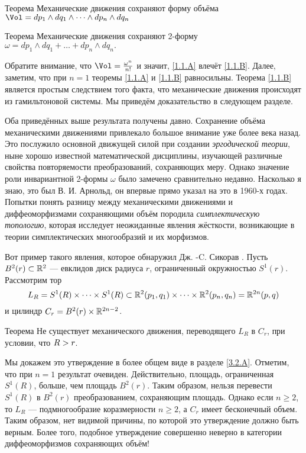 \begin{thm}{Теорема}\label{1.1.A}
Механические движения сохраняют форму объёма 
$\Vol=dp_1\wedge dq_1\wedge\dots\wedge d p_n\wedge dq_n$
\end{thm}

\begin{thm}{Теорема}\label{1.1.B}
Механические движения сохраняют 2-форму $\omega = dp_1 \wedge dq_1 +\dots
+ dp_n \wedge dq_n.$
\end{thm}

Обратите внимание, что $\Vol = \tfrac{\omega^n}{n!}$ и значит, \ref{1.1.A} влечёт \ref{1.1.B}.
Далее, заметим, что при $n = 1$ теоремы \ref{1.1.A} и \ref{1.1.B} равносильны.
Теорема \ref{1.1.B} является простым следствием того факта, что механические движения происходят из гамильтоновой системы.
Мы приведём доказательство в следующем разделе.

Оба приведённых выше результата получены давно.
Сохранение объёма механическими движениями привлекало большое внимание уже более века назад.
Это послужило основной движущей силой при создании {}\emph{эргодической теории}, ныне хорошо известной математической дисциплины, изучающей различные свойства повторяемости преобразований, сохраняющих меру.
Однако значение роли инвариантной 2-формы $\omega$ было замечено сравнительно недавно.
Насколько я знаю, это был В. И. Арнольд, он впервые прямо указал на это в 1960-х годах.
Попытки понять разницу между механическими движениями и диффеоморфизмами сохраняющими объём породила {}\emph{симплектическую топологию}, которая исследует неожиданные явления жёсткости, возникающие в теории симплектических многообразий и их морфизмов.

Вот пример такого явления, которое обнаружил Дж. -C. Сикорав \cite{S1}.
Пусть $B^2(r) \subset \mathbb{R}^2$ — евклидов диск радиуса $r$, ограниченный окружностью $S^1(r)$.
Рассмотрим тор 
\[L_R = 
S^1 (R) \times\dots\times S^1(R) \subset \mathbb{R}^2 (p_1, q_1) \times\dots\times \mathbb{R}^2 (p_n, q_n) =\mathbb{R}^{2n} (p, q)\]
и цилиндр $C_r = B^2 (r) \times \mathbb{R}^{2n-2}$.

\begin{thm}{Теорема}\label{1.1.C}
Не существует механического движения, переводящего $L_R$ в $C_r$, при условии, что $R\z>r$.
\end{thm}

Мы докажем это утверждение в более общем виде в разделе \ref{3.2.A}.
Отметим, что при $n = 1$ результат очевиден.
Действительно, площадь, ограниченная $S^1 (R)$, больше, чем площадь $B^2 (r)$.
Таким образом, нельзя перевести $S^1(R)$ в $B^2(r)$ преобразованием, сохраняющим площадь.
Однако если $n \ge 2$, то $L_R$ — подмногообразие коразмерности $n \ge 2$, а $C_r$ имеет бесконечный объем.
Таким образом, нет видимой причины, по которой это утверждение должно быть верным.
Более того, подобное утверждение совершенно неверно в категории диффеоморфизмов сохраняющих объём!


